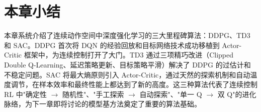 \section{本章小结}

本章系统介绍了连续动作空间中深度强化学习的三大里程碑算法：DDPG、TD3 和 SAC。DDPG 首次将 DQN 的经验回放和目标网络技术成功移植到 Actor-Critic 框架中，为连续控制打开了大门。TD3 通过三项精巧改进（Clipped Double Q-Learning、延迟策略更新、目标策略平滑）解决了 DDPG 的过估计和不稳定问题。SAC 将最大熵原则引入 Actor-Critic，通过天然的探索机制和自动温度调节，在样本效率和最终性能上都达到了新的高度。这三种算法代表了连续控制 RL 中"确定性 $\to$ 随机性"、"手工探索 $\to$ 自动探索"、"单一 Q $\to$ 双 Q"的进化脉络，为下一章即将讨论的模型基方法奠定了重要的算法基础。


